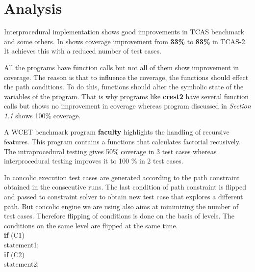 \documentclass[12pt,oneside]{book}
\begin{document}
\section{Analysis}
Interprocedural implementation shows good improvements in TCAS benchmark and some others. In shows coverage improvement from \textbf{33\%} to \textbf{83\%} in TCAS-2. It achieves this with a reduced number of test cases.
  
All the programs have function calls but not all of them show improvement in coverage. The reason is that to influence the coverage, the functions should effect the path conditions. To do this, functions should alter the symbolic state of the variables of the program. That is why programs like \textbf{crest2} have several function calls but shows no improvement in coverage whereas program discussed in \textit{Section 1.1} shows 100\% coverage. 

A WCET benchmark program \textbf{faculty} highlights the handling of recursive features. This program contains a functions that calculates factorial recusively. The intraprocedural testing gives 50\% coverage in 3 test cases whereas interprocedural testing improves it to 100 \% in 2 test cases.  

In concolic execution test cases are generated according to the path constraint obtained in the consecutive runs. The last condition of path constraint is flipped and passed to constraint solver to obtain new test case that explores a different path. But concolic engine we are using also aims at minimizing the number of test cases. Therefore flipping of conditions is done on the basis of levels. The conditions on the same level are flipped at the same time.\\ 

\vspace{-5mm}
\hspace{5cm}
\textbf{if} (C1)   \\

\vspace{-10mm}
\hspace{5.25cm} statement1;
\hspace{6cm}\\ 

\vspace{-8mm}
\hspace{5cm}
\textbf{if} (C2)   \\

\vspace{-10mm}
\hspace{5.25cm} statement2;
\hspace{6cm}  \\
\end{document}
